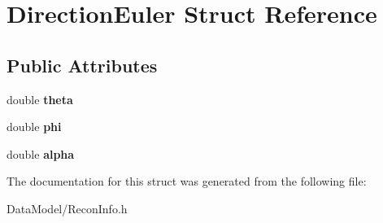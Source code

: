 \hypertarget{structDirectionEuler}{\section{Direction\-Euler Struct Reference}
\label{structDirectionEuler}
}
\subsection*{Public Attributes}
\begin{DoxyCompactItemize}
\item 
\hypertarget{structDirectionEuler_afb5740bb67a68cf8845de3718ae058aa}{double {\bfseries theta}}\label{structDirectionEuler_afb5740bb67a68cf8845de3718ae058aa}

\item 
\hypertarget{structDirectionEuler_a8dc1a0f63653769875644cdbf7ecd36c}{double {\bfseries phi}}\label{structDirectionEuler_a8dc1a0f63653769875644cdbf7ecd36c}

\item 
\hypertarget{structDirectionEuler_a07ef38372e6bf743cef6e10f3a622910}{double {\bfseries alpha}}\label{structDirectionEuler_a07ef38372e6bf743cef6e10f3a622910}

\end{DoxyCompactItemize}


The documentation for this struct was generated from the following file\-:\begin{DoxyCompactItemize}
\item 
Data\-Model/Recon\-Info.\-h\end{DoxyCompactItemize}
